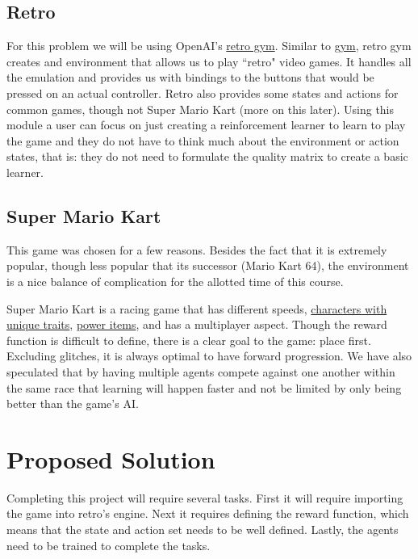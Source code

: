 \documentclass[12pt,letter]{article}
\begin{document}
\subsection{Retro}
For this problem we will be using OpenAI's \href{https://github.com/openai/retro/}
{retro gym}. Similar to \href{https://github.com/openai/gym}{gym}, retro gym 
creates and environment that allows us to play ``retro" video games. It handles
all the emulation and provides us with bindings to the buttons that would be
pressed on an actual controller. Retro also provides some states and actions for
common games, though not Super Mario Kart (more on this later). Using this
module a user can focus on just creating a reinforcement learner to learn to 
play the game and they do not have to think much about the environment or action
states, that is: they do not need to formulate the quality matrix to create a
basic learner. 

\subsection{Super Mario Kart}
This game was chosen for a few reasons. Besides the fact that it is extremely 
popular, though less popular that its successor (Mario Kart 64), the environment
is a nice balance of complication for the allotted time of this course. 

Super Mario Kart is a racing game that has different speeds, 
\href{https://strategywiki.org/wiki/Super_Mario_Kart/Characters}{characters with
unique traits}, \href{https://strategywiki.org/wiki/Super_Mario_Kart/Items}
{power items}, and has a multiplayer aspect. Though the reward 
function is difficult to define, there is a clear goal to the game: place first. 
Excluding glitches, it is always optimal to have forward progression. We have 
also speculated that by having multiple agents compete against one another within
the same race that learning will happen faster and not be limited by only being 
better than the game's AI. 

\section{Proposed Solution}
Completing this project will require several tasks. First it will require importing
the game into retro's engine. Next it requires defining the reward function, which
means that the state and action set needs to be well defined. Lastly, the agents
need to be trained to complete the tasks.
\end{document}
